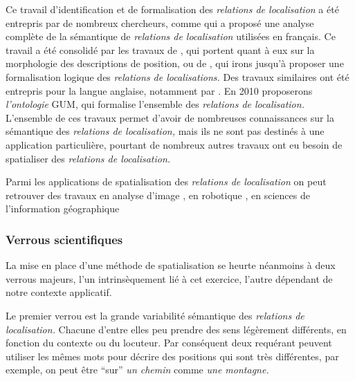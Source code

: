Ce travail d'identification et de formalisation des \emph{relations de
  localisation} a été entrepris par de nombreux chercheurs, comme
\textcite{Vandeloise1986} qui a proposé une analyse complète de la
sémantique de \emph{relations de localisation} utilisées en
français. Ce travail a été consolidé par les travaux de
\textcite{Borillo1998}, qui portent quant à eux sur la morphologie des
descriptions de position, ou de \textcite{Aurnague1993, Aurnague1997},
qui irons jusqu'à proposer une formalisation logique des
\emph{relations de localisations.} Des travaux similaires ont été
entrepris pour la langue anglaise, notamment par
\autocite{Kracht2002,Mark1999,Freksa2018,Carlson2005,Lang1991,Matsakis2010}.
En 2010 \textcite{Bateman2010} proposerons \emph{l'ontologie} GUM, qui
formalise l'ensemble des \emph{relations de localisation.} L'ensemble
de ces travaux permet d'avoir de nombreuses connaissances sur la
sémantique des \emph{relations de localisation,} mais ils ne sont pas
destinés à une application particulière, pourtant de nombreux autres
travaux ont eu besoin de spatialiser des \emph{relations de
  localisation.}

Parmi les applications de spatialisation des \emph{relations de
  localisation} on peut retrouver des travaux en analyse d'image
\autocite{Hudelot2008, Hudelot2008a,Bloch1996, Vanegas2011,
  Takemura2012}, en robotique \autocite{Skubic2004}, en sciences de
l'information géographique
\autocite{Xu2007a,Xu2007,Xu2006,Wolter2018,Dittrich2015,Du2016,Hornsby2009,Mathet2000,Hall2015}



\subsubsection{Verrous scientifiques}

La mise en place d'une méthode de spatialisation se heurte néanmoins à
deux verrous majeurs, l'un intrinsèquement lié à cet exercice, l'autre
dépendant de notre contexte applicatif.

Le premier verrou est la grande variabilité sémantique des
\emph{relations de localisation.} Chacune d'entre elles peu prendre
des sens légèrement différents, en fonction du contexte ou du
locuteur. Par conséquent deux requérant peuvent utiliser les mêmes
mots pour décrire des positions qui sont très différentes, par
exemple, on peut être \enquote{sur} \emph{un chemin} comme \emph{une
  montagne.}

